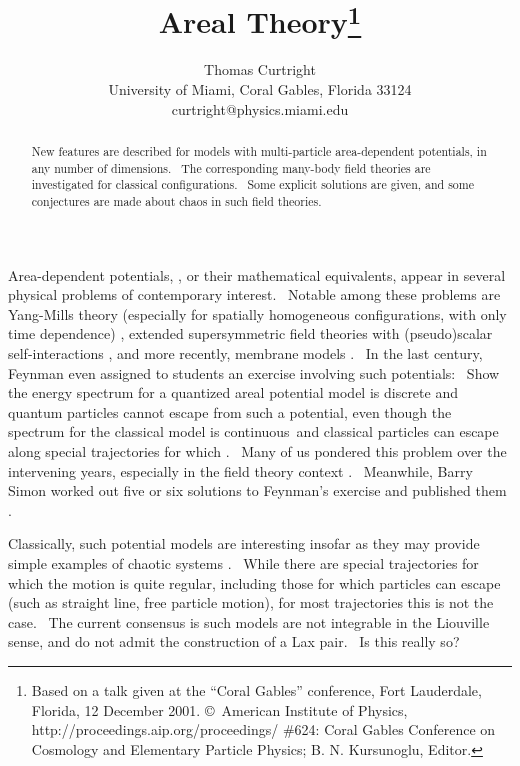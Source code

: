 \documentclass[a4paper,12pt]{article}%
\begin{document}
\title{Areal Theory\thanks{Based on a talk given at the ``Coral Gables'' conference,
Fort Lauderdale, Florida, 12 December 2001. \copyright\ American Institute of
Physics, http://proceedings.aip.org/proceedings/ \#624: Coral Gables
Conference on Cosmology and Elementary Particle Physics; B. N. Kursunoglu, Editor.}}
\author{{\large Thomas Curtright}\\{\normalsize University of Miami, Coral Gables, Florida 33124}\\{\small curtright@physics.miami.edu}}
\date{}
\maketitle

\begin{abstract}
New features are described for models with multi-particle area-dependent
potentials, in any number of dimensions. \ The corresponding many-body field
theories are investigated for classical configurations. \ Some explicit
solutions are given, and some conjectures are made about chaos in such field theories.

\bigskip

\bigskip

\end{abstract}

Area-dependent potentials, \coordHE{}, or their mathematical equivalents, appear in several physical
problems of contemporary interest. \ Notable among these problems are
Yang-Mills theory (especially for spatially homogeneous configurations, with
only time dependence) \cite{Chang}, extended supersymmetric field theories
with (pseudo)scalar self-interactions \cite{Howe,Ferrara,Lee}, and more
recently, membrane models \cite{de Wit,Graf}. \ In the last century, Feynman
\cite{Feynman} even assigned to students an exercise involving such
potentials: \ Show the energy spectrum for a quantized areal potential model
is discrete and quantum particles cannot escape from such a potential, even
though the spectrum for the classical model is continuous\ and classical
particles can escape along special trajectories for which \coordHE{}. \ Many of us
pondered this problem over the intervening years, especially in the field
theory context \cite{TLC1989}. \ Meanwhile, Barry Simon worked out five or six
solutions to Feynman's exercise and published them \cite{Simon}.

Classically, such potential models are interesting insofar as they may provide
simple examples of chaotic systems \cite{Saviddy,Carnegie}. \ While there are
special trajectories for which the motion is quite regular, including those
for which particles can escape (such as straight line, free particle motion),
for most trajectories this is not the case. \ The current consensus is such
models are not integrable in the Liouville sense, and do not admit the
construction of a Lax pair. \ Is this really so?
\end{document}
